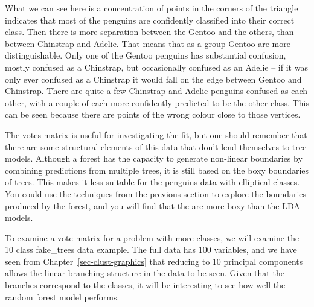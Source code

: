 \documentclass[
  letterpaper,
]{book}
\newenvironment{Shaded}{\begin{snugshade}}{\end{snugshade}}
\newcommand{\AttributeTok}[1]{\textcolor[rgb]{0.40,0.45,0.13}{#1}}
\newcommand{\ConstantTok}[1]{\textcolor[rgb]{0.56,0.35,0.01}{#1}}
\newcommand{\DecValTok}[1]{\textcolor[rgb]{0.68,0.00,0.00}{#1}}
\newcommand{\FunctionTok}[1]{\textcolor[rgb]{0.28,0.35,0.67}{#1}}
\newcommand{\NormalTok}[1]{\textcolor[rgb]{0.00,0.23,0.31}{#1}}
\newcommand{\OtherTok}[1]{\textcolor[rgb]{0.00,0.23,0.31}{#1}}
\newcommand{\SpecialCharTok}[1]{\textcolor[rgb]{0.37,0.37,0.37}{#1}}
\begin{document}
What we can see here is a concentration of points in the corners of the
triangle indicates that most of the penguins are confidently classified
into their correct class. Then there is more separation between the
Gentoo and the others, than between Chinstrap and Adelie. That means
that as a group Gentoo are more distinguishable. Only one of the Gentoo
penguins has substantial confusion, mostly confused as a Chinstrap, but
occasionally confused as an Adelie -- if it was only ever confused as a
Chinstrap it would fall on the edge between Gentoo and Chinstrap. There
are quite a few Chinstrap and Adelie penguins confused as each other,
with a couple of each more confidently predicted to be the other class.
This can be seen because there are points of the wrong colour close to
those vertices.

The votes matrix is useful for investigating the fit, but one should
remember that there are some structural elements of this data that don't
lend themselves to tree models. Although a forest has the capacity to
generate non-linear boundaries by combining predictions from multiple
trees, it is still based on the boxy boundaries of trees. This makes it
less suitable for the penguins data with elliptical classes. You could
use the techniques from the previous section to explore the boundaries
produced by the forest, and you will find that the are more boxy than
the LDA models.

To examine a vote matrix for a problem with more classes, we will
examine the 10 class fake\_trees data example. The full data has 100
variables, and we have seen from Chapter~\ref{sec-clust-graphics} that
reducing to 10 principal components allows the linear branching
structure in the data to be seen. Given that the branches correspond to
the classes, it will be interesting to see how well the random forest
model performs.

\begin{Shaded}
\end{Shaded}
\end{document}
